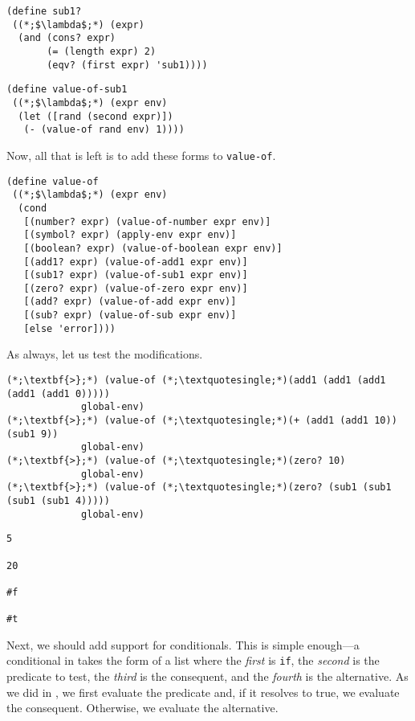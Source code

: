 \begin{clrr}[]{}
\begin{lstlisting}[language=MyScheme]
(define sub1?
 ((*;$\lambda$;*) (expr)
  (and (cons? expr)
       (= (length expr) 2)
       (eqv? (first expr) 'sub1))))
\end{lstlisting}
\tcblower
\begin{lstlisting}[language=MyNLNScheme]
(define value-of-sub1
 ((*;$\lambda$;*) (expr env)
  (let ([rand (second expr)])
   (- (value-of rand env) 1))))
\end{lstlisting}
\end{clrr}

\noindent Now, all that is left is to add these forms to \texttt{value-of}.

\begin{cl}[]{}\begin{lstlisting}[language=MyScheme]
(define value-of
 ((*;$\lambda$;*) (expr env)
  (cond
   [(number? expr) (value-of-number expr env)]
   [(symbol? expr) (apply-env expr env)]
   [(boolean? expr) (value-of-boolean expr env)]
   [(add1? expr) (value-of-add1 expr env)]
   [(sub1? expr) (value-of-sub1 expr env)]
   [(zero? expr) (value-of-zero expr env)]
   [(add? expr) (value-of-add expr env)]
   [(sub? expr) (value-of-sub expr env)]
   [else 'error])))
\end{lstlisting}\end{cl}

\noindent As always, let us test the modifications.

\begin{clonarrow}[]{}
\begin{lstlisting}[language=MyNLNScheme]
(*;\textbf{>};*) (value-of (*;\textquotesingle;*)(add1 (add1 (add1 (add1 (add1 0))))) 
             global-env)
(*;\textbf{>};*) (value-of (*;\textquotesingle;*)(+ (add1 (add1 10)) (sub1 9))
             global-env)
(*;\textbf{>};*) (value-of (*;\textquotesingle;*)(zero? 10)
             global-env)
(*;\textbf{>};*) (value-of (*;\textquotesingle;*)(zero? (sub1 (sub1 (sub1 (sub1 4)))))
             global-env)
\end{lstlisting}
\tcblower
\begin{lstlisting}[language=MyOutput]
5

20

#f

#t
\end{lstlisting}
\end{clonarrow}

Next, we should add support for conditionals. This is simple enough---a conditional in  takes the form of a list where the \textit{first} is \texttt{if}, the \textit{second} is the predicate to test, the \textit{third} is the consequent, and the \textit{fourth} is the alternative. As we did in , we first evaluate the predicate and, if it resolves to true, we evaluate the consequent. Otherwise, we evaluate the alternative.

